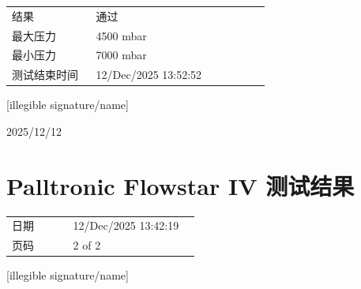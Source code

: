 \documentclass[UTF8,10pt,a4paper,fontset=fandol]{ctexart}
\newcommand{\fieldvalue}[1]{#1}
\newcommand{\handwritten}[1]{#1}
\begin{document}
\begin{tabular}{@{}p{0.30\linewidth}p{0.62\linewidth}@{}}
结果 &
\fieldvalue{通过} \\[2pt]
最大压力 &
\fieldvalue{4500 mbar} \\[2pt]
最小压力 &
\fieldvalue{7000 mbar} \\[2pt]
测试结束时间 &
\fieldvalue{12/Dec/2025 13:52:52}
\end{tabular}

\handwritten{[illegible signature/name]}

\handwritten{2025/12/12}

\section{Palltronic Flowstar IV 测试结果}

\begin{tabular}{@{}p{0.30\linewidth}p{0.62\linewidth}@{}}
日期 &
\fieldvalue{12/Dec/2025 13:42:19} \\[2pt]
页码 &
\fieldvalue{2 of 2}
\end{tabular}

\medskip

\begin{center}
\end{center}

\handwritten{[illegible signature/name]}
\end{document}
